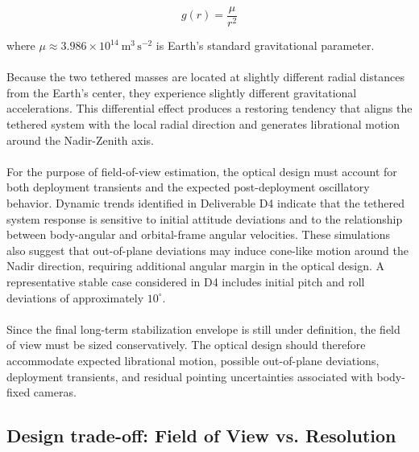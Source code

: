 \begin{equation}
g(r) = \frac{\mu}{r^2}
\label{eq:gravity}
\end{equation}

where $\mu \approx 3.986 \times 10^{14}\ \mathrm{m^3\,s^{-2}}$ is Earth's standard gravitational parameter.
\\\\
Because the two tethered masses are located at slightly different radial distances from the Earth's center, they experience slightly different gravitational accelerations. This differential effect produces a restoring tendency that aligns the tethered system with the local radial direction and generates librational motion around the Nadir-Zenith axis.
\\\\
For the purpose of field-of-view estimation, the optical design must account for both deployment transients and the expected post-deployment oscillatory behavior. Dynamic trends identified in Deliverable D4 indicate that the tethered system response is sensitive to initial attitude deviations and to the relationship between body-angular and orbital-frame angular velocities. These simulations also suggest that out-of-plane deviations may induce cone-like motion around the Nadir direction, requiring additional angular margin in the optical design. A representative stable case considered in D4 includes initial pitch and roll deviations of approximately $10^\circ$.
\\\\
Since the final long-term stabilization envelope is still under definition, the field of view must be sized conservatively. The optical design should therefore accommodate expected librational motion, possible out-of-plane deviations, deployment transients, and residual pointing uncertainties associated with body-fixed cameras.

\subsection{Design trade-off: Field of View vs. Resolution}

